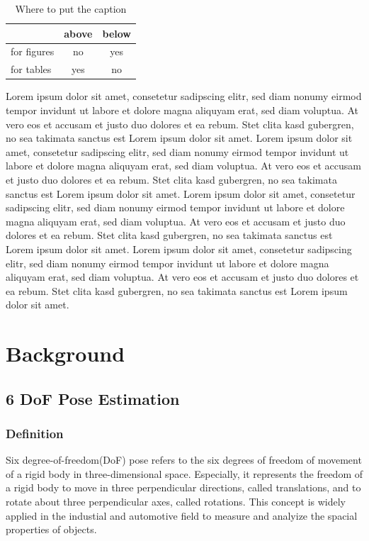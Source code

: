\documentclass[12pt,DIV14,BCOR12mm,a4paper,footinclude=false,headinclude,parskip=half-,twoside,openright,cleardoublepage=empty,toc=index,bibliography=totoc,listof=totoc]{scrreprt}
\numberwithin{equation}{chapter}
\begin{document}
\begin{table}
    \centering
    \caption{Where to put the caption}
    \label{captions}
    \begin{tabular}{lcc}
        \toprule
         & above & below\\
        \midrule
        for figures & no & yes\\
        for tables & yes & no\\
        \bottomrule
    \end{tabular}
\end{table}


Lorem ipsum dolor sit amet, consetetur sadipscing elitr, sed diam nonumy eirmod tempor invidunt ut labore et dolore magna aliquyam erat, sed diam voluptua. At vero eos et accusam et justo duo dolores et ea rebum. Stet clita kasd gubergren, no sea takimata sanctus est Lorem ipsum dolor sit amet. Lorem ipsum dolor sit amet, consetetur sadipscing elitr, sed diam nonumy eirmod tempor invidunt ut labore et dolore magna aliquyam erat, sed diam voluptua. At vero eos et accusam et justo duo dolores et ea rebum. Stet clita kasd gubergren, no sea takimata sanctus est Lorem ipsum dolor sit amet.
\newpage
Lorem ipsum dolor sit amet, consetetur sadipscing elitr, sed diam nonumy eirmod tempor invidunt ut labore et dolore magna aliquyam erat, sed diam voluptua. At vero eos et accusam et justo duo dolores et ea rebum. Stet clita kasd gubergren, no sea takimata sanctus est Lorem ipsum dolor sit amet. Lorem ipsum dolor sit amet, consetetur sadipscing elitr, sed diam nonumy eirmod tempor invidunt ut labore et dolore magna aliquyam erat, sed diam voluptua. At vero eos et accusam et justo duo dolores et ea rebum. Stet clita kasd gubergren, no sea takimata sanctus est Lorem ipsum dolor sit amet.

\chapter{Background}
\section{6 DoF Pose Estimation}
\subsection{Definition}
Six degree-of-freedom(DoF) pose refers to the six degrees of freedom of movement of a rigid body in three-dimensional space. Especially, it represents the freedom of a rigid body to move in three perpendicular directions, called translations, and to rotate about three perpendicular axes, called rotations. This concept is widely applied in the industial and automotive field to measure and analyize the spacial properties of objects.
\end{document}
